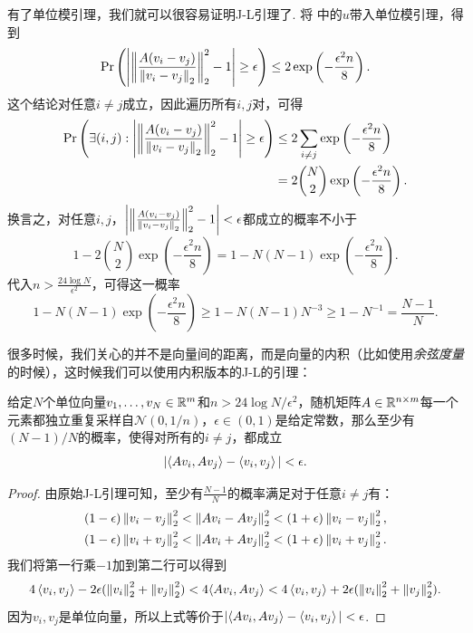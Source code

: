 有了单位模引理，我们就可以很容易证明J-L引理了. 将 中的$u$带入单位模引理，得到
\[
    \Pr\left(\left|\left\|\frac{A(v_i-v_j)}{\left\|v_i-v_j\right\|_2}\right\|_2^2 - 1 \right| \geq \epsilon\right)\leq  2\exp \left(-\frac{\epsilon^2 n}{8}\right). 
\]
这个结论对任意$i\neq j$成立，因此遍历所有$i,j$对，可得
\[
\begin{aligned}
    \Pr\left(\exists (i,j): \left|\left\|\frac{A(v_i-v_j)}{\left\|v_i-v_j\right\|_2}\right\|_2^2 - 1 \right| \geq \epsilon\right)
    &\leq 2 \sum_{i\neq j} \exp \left(-\frac{\epsilon^2 n}{8}\right) \\
    &=  2  \binom{N}{2}\exp \left(-\frac{\epsilon^2 n}{8}\right). 
\end{aligned}
\]
换言之，对任意$i,j$，$\left|\left\|\frac{A(v_i-v_j)}{\left\|v_i-v_j\right\|_2}\right\|_2^2 - 1 \right| < \epsilon$都成立的概率不小于
\[
1 - 2  \binom{N}{2}\exp \left(-\frac{\epsilon^2 n}{8}\right) = 1 - N(N-1)\exp \left(-\frac{\epsilon^2 n}{8}\right). 
\]
代入$n > \frac{24\log N}{\epsilon^2}$，可得这一概率
\[
1 - N(N-1)\exp \left(-\frac{\epsilon^2 n}{8}\right) \geq 1 - N(N-1)N^{-3}\geq 1 - N^{-1} = \frac{N-1}{N}. 
\]

很多时候，我们关心的并不是向量间的距离，而是向量的内积（比如使用\emph{余弦度量}的时候），这时候我们可以使用内积版本的J-L的引理：
\begin{theorem}\label{thm:johnson-lindenstrauss-lemma-inner-product}
    给定$N$个单位向量$v_1,\dots,v_N\in\mathbb{R}^m$和$n > 24\log N/\epsilon^2$，随机矩阵$A\in \mathbb{R}^{n\times m}$每一个元素都独立重复采样自$\mathcal N(0,1/n)$，$\epsilon \in (0,1)$是给定常数，那么至少有$(N-1)/N$的概率，使得对所有的$i\neq j$，都成立
    \[
        |\langle Av_i, Av_j\rangle - \left\langle{v_i},{v_j}\right\rangle|< \epsilon.
    \]
\end{theorem}    
\begin{proof}
由原始J-L引理可知，至少有$\frac{N-1}{N}$的概率满足对于任意$i\neq j$有：
    \[
    \begin{aligned}
        &(1 - \epsilon)\left\|v_i-v_j\right\|_2^2 < \left\|Av_i-Av_j\right\|_2^2< (1 + \epsilon)\left\|v_i-v_j\right\|_2^2, \\
        &(1 - \epsilon)\left\|v_i+v_j\right\|_2^2 < \left\|Av_i+Av_j\right\|_2^2 < (1 + \epsilon)\left\|v_i+v_j\right\|_2^2. 
    \end{aligned}
    \]
我们将第一行乘$-1$加到第二行可以得到
    \[
        4\left\langle{v_i},{v_j}\right\rangle - 2 \epsilon (\left\|v_i\right\|_2^2 + \left\|v_j\right\|_2^2) <4\langle Av_i, Av_j\rangle < 4\left\langle{v_i},{v_j}\right\rangle + 2 \epsilon (\left\|v_i\right\|_2^2 + \left\|v_j\right\|_2^2).
    \]
因为$v_i,v_j$是单位向量，所以上式等价于$|\langle Av_i, Av_j\rangle - \left\langle{v_i},{v_j}\right\rangle|<\epsilon$. 
\end{proof}

